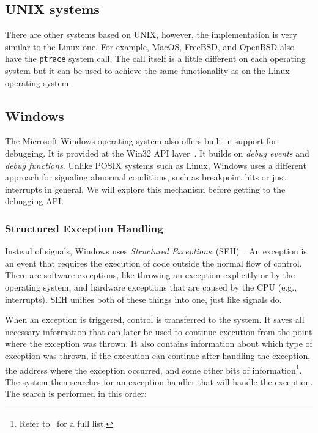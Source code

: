 \subsection{UNIX systems}
There are other systems based on UNIX, however, the implementation is very
similar to the Linux one. For example, MacOS, FreeBSD, and OpenBSD also have
the \texttt{ptrace} system call. The call itself is a little different on each
operating system but it can be used to achieve the same functionality as on the
Linux operating system.

\subsection{Windows}
The Microsoft Windows operating system also offers built-in support for
debugging. It is provided at the Win32 API
layer~\cite{windows-msdn-debugging-api, windows-press-debugging-api}. It builds
on \textit{debug events} and \textit{debug functions}. Unlike POSIX systems
such as Linux, Windows uses a different approach for signaling abnormal
conditions, such as breakpoint hits or just interrupts in general. We will
explore this mechanism before getting to the debugging API.

\subsubsection*{Structured Exception Handling}\label{section:seh}
Instead of signals, Windows uses \textit{Structured
Exceptions}~(SEH)~\cite{windows-msdn-seh}. An exception is an event that
requires the execution of code outside the normal flow of control. There are
software exceptions, like throwing an exception explicitly or by the operating
system, and hardware exceptions that are caused by the CPU (e.g., interrupts).
SEH unifies both of these things into one, just like signals do.

When an exception is triggered, control is transferred to the system. It saves
all necessary information that can later be used to continue execution from the
point where the exception was thrown. It also contains information about which
type of exception was thrown, if the execution can continue after handling the
exception, the address where the exception occurred, and some other bits of
information\footnote{Refer to~\cite{windows-msdn-seh} for a full list.}. The
system then searches for an exception handler that will handle the exception.
The search is performed in this order:

